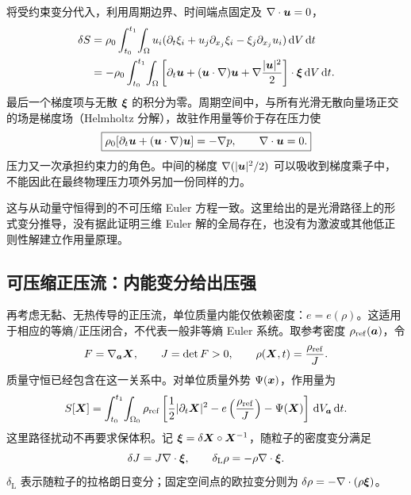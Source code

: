 将受约束变分代入，利用周期边界、时间端点固定及 $\nabla\cdot\bm{u}=0$，
\begin{align}
 \delta S
 &=\rho_0\int_{t_0}^{t_1}\!\int_\Omega
 u_i(\partial_t\xi_i+u_j\partial_{x_j}\xi_i-\xi_j\partial_{x_j}u_i)\,\mathrm d V\,\mathrm d t\\
 &=-\rho_0\int_{t_0}^{t_1}\!\int_\Omega
 \left[\partial_t\bm{u}+(\bm{u}\cdot\nabla)\bm{u}
 +\nabla\frac{|\bm{u}|^2}{2}\right]\cdot\bm{\xi}\,\mathrm d V\,\mathrm d t.
\end{align}
最后一个梯度项与无散 $\bm{\xi}$ 的积分为零。周期空间中，与所有光滑无散向量场正交的场是梯度场（Helmholtz 分解），故驻作用量等价于存在压力使
\begin{equation}
 \boxed{\rho_0[\partial_t\bm{u}+(\bm{u}\cdot\nabla)\bm{u}]
 =-\nabla p,\qquad\nabla\cdot\bm{u}=0.}
\end{equation}
压力又一次承担约束力的角色。中间的梯度 $\nabla(|\bm{u}|^2/2)$ 可以吸收到梯度乘子中，不能因此在最终物理压力项外另加一份同样的力。

这与从动量守恒得到的不可压缩 Euler 方程一致。这里给出的是光滑路径上的形式变分推导，没有据此证明三维 Euler 解的全局存在，也没有为激波或其他低正则性解建立作用量原理。

\subsection{可压缩正压流：内能变分给出压强}

再考虑无黏、无热传导的正压流，单位质量内能仅依赖密度：$e=e(\rho)$。这适用于相应的等熵/正压闭合，不代表一般非等熵 Euler 系统。取参考密度 $\rho_{\mathrm{ref}}(\bm{a})$，令
\begin{equation}
 F=\nabla_{\bm{a}}\bm{X},\qquad J=\det F>0,\qquad
 \rho(\bm{X},t)=\frac{\rho_{\mathrm{ref}}}{J}.
\end{equation}
质量守恒已经包含在这一关系中。对单位质量外势 $\Psi(\bm{x})$，作用量为
\begin{equation}
 S[\bm{X}]=\int_{t_0}^{t_1}\!\int_{\Omega_0}\rho_{\mathrm{ref}}
 \left[\frac12|\partial_t\bm{X}|^2-e\left(\frac{\rho_{\mathrm{ref}}}{J}\right)
 -\Psi(\bm{X})\right]\,\mathrm d V_{\bm{a}}\,\mathrm d t.
\end{equation}
这里路径扰动不再要求保体积。记 $\bm{\xi}=\delta\bm{X}\circ\bm{X}^{-1}$，随粒子的密度变分满足
\begin{equation}
 \delta J=J\nabla\cdot\bm{\xi},\qquad
 \delta_{\mathrm L}\rho=-\rho\nabla\cdot\bm{\xi}.
\end{equation}
$\delta_{\mathrm L}$ 表示随粒子的拉格朗日变分；固定空间点的欧拉变分则为 $\delta\rho=-\nabla\cdot(\rho\bm{\xi})$。


